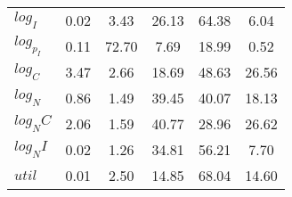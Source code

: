 \begin{center}
\begin{longtable}{lccccc}
$log_I     $	 & 	        0.02	 & 	        3.43	 & 	       26.13	 & 	       64.38	 & 	        6.04 \\ 
$log_p_I   $	 & 	        0.11	 & 	       72.70	 & 	        7.69	 & 	       18.99	 & 	        0.52 \\ 
$log_C     $	 & 	        3.47	 & 	        2.66	 & 	       18.69	 & 	       48.63	 & 	       26.56 \\ 
$log_N     $	 & 	        0.86	 & 	        1.49	 & 	       39.45	 & 	       40.07	 & 	       18.13 \\ 
$log_NC    $	 & 	        2.06	 & 	        1.59	 & 	       40.77	 & 	       28.96	 & 	       26.62 \\ 
$log_NI    $	 & 	        0.02	 & 	        1.26	 & 	       34.81	 & 	       56.21	 & 	        7.70 \\ 
$util      $	 & 	        0.01	 & 	        2.50	 & 	       14.85	 & 	       68.04	 & 	       14.60 \\ 
\end{longtable}
 \end{center}
